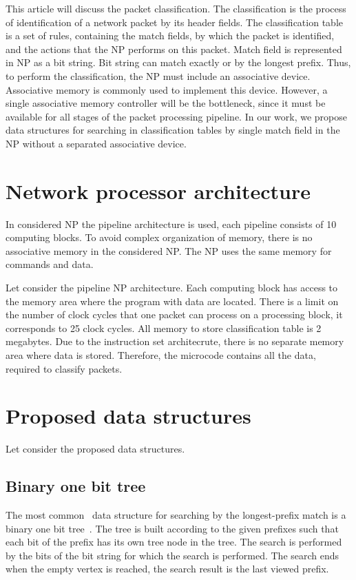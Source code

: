 \documentclass[conference]{IEEEtran}
\begin{document}
        This article will discuss the packet classification.
        The classification is the process of identification of a network packet 
        by its header fields.
        The classification table is a set of rules, containing the match fields, 
        by which the packet is identified,
        and the actions that the NP performs on this packet.
        Match field is represented in NP as a bit string. 
        Bit string can match exactly or by the longest prefix.
        Thus, to perform the classification, the NP must include an associative device. 
		Associative memory is commonly used to implement this device.
        However, a single associative memory controller will be the bottleneck, 
        since it must be available for all stages of the packet processing pipeline.
        In our work, we propose data structures for searching in classification 
        tables by single match field in the NP without a separated associative device.
    \section{Network processor architecture}
        \label{section:problem}
        In considered NP the pipeline architecture is used, each pipeline consists of 10 computing blocks. 
        To avoid complex organization of memory, there is no associative memory in the considered NP. 
        The NP uses the same memory for commands and data.
         
        Let consider the pipeline NP architecture. 
        Each computing block has access to the memory area where the program with data are located.
        There is a limit on the number of clock cycles that one packet can process on a processing block, 
        it corresponds to 25 clock cycles.
        All memory to store classification table is 2 megabytes.
        Due to the instruction set architecrute, there is no separate memory area where data is stored. 
        Therefore, the microcode contains all the data, required to classify packets.

    \section{Proposed data structures}
        Let consider the proposed data structures.
        \subsection{Binary one bit tree}
            The most common~\cite{behdadfar2009scalar} data structure for searching by 
            the longest-prefix match is a binary one bit tree~\cite{chao2007high:1}.
            The tree is built according to the given prefixes such that each bit of the prefix has its own tree node in the tree. 
            The search is performed by the bits of the bit string for which the search is performed. 
            The search ends when the empty vertex is reached, the search result is the last viewed prefix.
 
\end{document}
